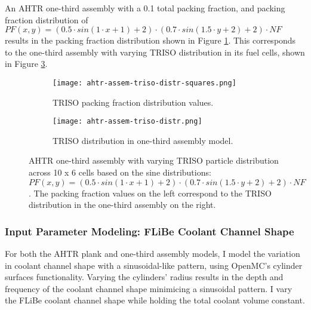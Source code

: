 An \gls{AHTR} one-third assembly with a 0.1 total packing fraction, and packing 
fraction distribution of $PF(x, y) = \left(0.5\cdot sin(1\cdot x + 1) + 2\right) \cdot 
\left(0.7\cdot sin(1.5\cdot y + 2) + 2\right) \cdot NF$ results in the packing fraction 
distribution shown in Figure \ref{fig:ahtr-assem-triso-distr-squares}.
This corresponds to the one-third assembly with varying TRISO distribution in its fuel 
cells, shown in Figure \ref{fig:ahtr-assem-triso-distr}. 
\begin{figure}[htbp]
    \centering
    \begin{subfigure}{0.49\textwidth}
        \texttt{[image: ahtr-assem-triso-distr-squares.png]}
        \caption{TRISO packing fraction distribution values.}
        \label{fig:ahtr-assem-triso-distr-squares} 
    \end{subfigure}
    \begin{subfigure}{0.49\textwidth}
        \texttt{[image: ahtr-assem-triso-distr.png]}
        \raggedleft
        \caption{TRISO distribution in one-third assembly model.}
        \label{fig:ahtr-assem-triso-distr} 
    \end{subfigure}
    \caption{\acrfull{AHTR} one-third assembly with varying \gls{TRISO} particle 
        distribution across 10 x 6 cells based on the sine distributions: $PF(x, y) = 
        \left(0.5\cdot sin(1\cdot x + 1) + 2\right) \cdot 
        \left(0.7\cdot sin(1.5\cdot y + 2) + 2\right) \cdot NF$. 
        The packing fraction values on the left correspond to the TRISO 
        distribution in the one-third assembly on the right.}
\end{figure}

\subsubsection{Input Parameter Modeling: \gls{FLiBe} Coolant Channel Shape}
For both the \gls{AHTR} plank and one-third assembly models, I model the variation in 
coolant channel shape with a sinusoidal-like pattern, using OpenMC's cylinder surfaces
functionality.
Varying the cylinders' radius results in the depth and frequency of the coolant 
channel shape minimicing a sinusoidal pattern.
I vary the \gls{FLiBe} coolant channel shape while holding the total coolant volume 
constant. 

